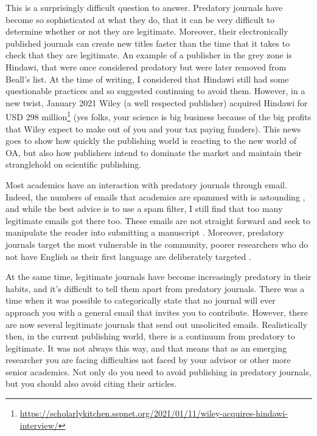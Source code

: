 \documentclass[
]{krantz}
\renewcommand{\href}[2]{#2\footnote{\url{#1}}}
\begin{document}
This is a surprisingly difficult question to answer. Predatory journals have become so sophisticated at what they do, that it can be very difficult to determine whether or not they are legitimate. Moreover, their electronically published journals can create new titles faster than the time that it takes to check that they are legitimate. An example of a publisher in the grey zone is Hindawi, that were once considered predatory but were later removed from Beall's list. At the time of writing, I considered that Hindawi still had some questionable practices and so suggested continuing to avoid them. However, in a new twist, January 2021 Wiley (a well respected publisher) \href{https://scholarlykitchen.sspnet.org/2021/01/11/wiley-acquires-hindawi-interview/}{acquired Hindawi for USD 298 million} (yes folks, your science is big business because of the big profits that Wiley expect to make out of you and your tax paying funders). This news goes to show how quickly the publishing world is reacting to the new world of OA, but also how publishers intend to dominate the market and maintain their stranglehold on scientific publishing.

Most academics have an interaction with predatory journals through email. Indeed, the numbers of emails that academics are spammed with is astounding \citep{vandenberg2021solution}, and while the best advice is to use a spam filter, I still find that too many legitimate emails got there too. These emails are not straight forward and seek to manipulate the reader into submitting a manuscript \citep{bett2020predatory}. Moreover, predatory journals target the most vulnerable in the community, poorer researchers who do not have English as their first language are deliberately targeted \citep[\citet{lund2020analysis}]{bett2020predatory}.

At the same time, legitimate journals have become increasingly predatory in their habits, and it's difficult to tell them apart from predatory journals. There was a time when it was possible to categorically state that no journal will ever approach you with a general email that invites you to contribute. However, there are now several legitimate journals that send out unsolicited emails. Realistically then, in the current publishing world, there is a continuum from predatory to legitimate. It was not always this way, and that means that as an emerging researcher you are facing difficulties not faced by your advisor or other more senior academics. Not only do you need to avoid publishing in predatory journals, but you should also avoid citing their articles.
\end{document}
